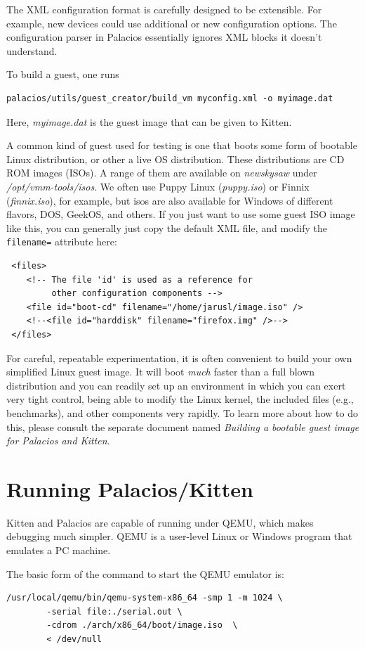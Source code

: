 \documentclass[11pt]{article}
\begin{document}
The XML configuration format is carefully designed to be extensible.
For example, new devices could use additional or new configuration
options.  The configuration parser in Palacios essentially ignores XML
blocks it doesn't understand. 


To build a guest, one runs
\begin{verbatim}
palacios/utils/guest_creator/build_vm myconfig.xml -o myimage.dat
\end{verbatim}
Here, {\em myimage.dat} is the guest image that can be given to
Kitten. 

A common kind of guest used for testing is one that boots some form of
bootable Linux distribution, or other a live OS distribution.  These
distributions are CD ROM images (ISOs).  A range of them are available
on {\em newskysaw} under {\em /opt/vmm-tools/isos}.  We often use
Puppy Linux ({\em puppy.iso}) or Finnix ({\em finnix.iso}), for
example, but isos are also available for Windows of different flavors,
DOS, GeekOS, and others.  If you just want to use some guest ISO image
like this, you can generally just copy the default XML file, and
modify the
\verb.filename=. attribute here:
\begin{verbatim}
 <files>
    <!-- The file 'id' is used as a reference for 
         other configuration components -->
    <file id="boot-cd" filename="/home/jarusl/image.iso" />
    <!--<file id="harddisk" filename="firefox.img" />-->
 </files>
\end{verbatim}

For careful, repeatable experimentation, it is often convenient to
build your own simplified Linux guest image.  It will boot {\em much}
faster than a full blown distribution and you can readily set up an
environment in which you can exert very tight control, being able to
modify the Linux kernel, the included files (e.g., benchmarks), and
other components very rapidly.  To learn more about how to do this,
please consult the separate document named {\em Building a bootable
guest image for Palacios and Kitten}.

\section{Running Palacios/Kitten}
Kitten and Palacios are capable of running under QEMU, which makes
debugging much simpler.  QEMU is a user-level Linux or Windows program
that emulates a PC machine. 

The basic form of the command to start the QEMU emulator is:
\begin{verbatim}
/usr/local/qemu/bin/qemu-system-x86_64 -smp 1 -m 1024 \
        -serial file:./serial.out \
        -cdrom ./arch/x86_64/boot/image.iso  \
        < /dev/null
\end{verbatim}
\end{document}
